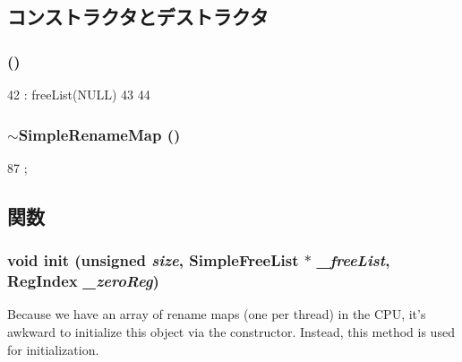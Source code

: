 \subsection{コンストラクタとデストラクタ}
\hypertarget{classSimpleRenameMap_a1dc644bcb497c501890dbc78d1acf28d}{
\subsubsection[{SimpleRenameMap}]{ ()}}
\label{classSimpleRenameMap_a1dc644bcb497c501890dbc78d1acf28d}



\begin{DoxyCode}
42     : freeList(NULL)
43 {
44 }
\end{DoxyCode}
\hypertarget{classSimpleRenameMap_af5717bfeec7da90752952ab38dcab5c5}{
\subsubsection[{$\sim$SimpleRenameMap}]{\setlength{\rightskip}{0pt plus 5cm}$\sim${\bf SimpleRenameMap} ()}}
\label{classSimpleRenameMap_af5717bfeec7da90752952ab38dcab5c5}



\begin{DoxyCode}
87 {};
\end{DoxyCode}


\subsection{関数}
\hypertarget{classSimpleRenameMap_a3f27b4e0339fcd39d0f73659b8c72202}{
\subsubsection[{init}]{\setlength{\rightskip}{0pt plus 5cm}void init (unsigned {\em size}, \/  {\bf SimpleFreeList} $\ast$ {\em \_\-freeList}, \/  {\bf RegIndex} {\em \_\-zeroReg})}}
\label{classSimpleRenameMap_a3f27b4e0339fcd39d0f73659b8c72202}
Because we have an array of rename maps (one per thread) in the CPU, it's awkward to initialize this object via the constructor. Instead, this method is used for initialization. 



